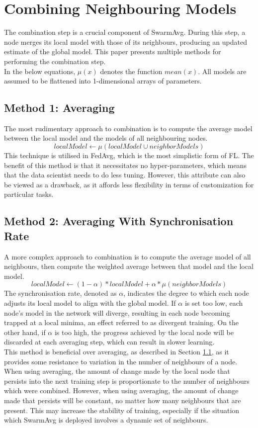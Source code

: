 \section{Combining Neighbouring Models} \label{mcm}
The combination step is a crucial component of SwarmAvg. During this step, a node merges its local model with those of its neighbours, producing an updated estimate of the global model. This paper presents multiple methods for performing the combination step. \\

In the below equations, $\mu(x)$ denotes the function $mean(x)$. All models are assumed to be flattened into 1-dimensional arrays of parameters.

\subsection{Method 1: Averaging} \label{mcm:avg}
The most rudimentary approach to combination is to compute the average model between the local model and the models of all neighbouring nodes.
\[ localModel \gets \mu(localModel \cup neighborModels) \]
This technique is utilised in FedAvg, which is the most simplistic form of FL. The benefit of this method is that it necessitates no hyper-parameters, which means that the data scientist needs to do less tuning. However, this attribute can also be viewed as a drawback, as it affords less flexibility in terms of customization for particular tasks.

\subsection{Method 2: Averaging With Synchronisation Rate}
A more complex approach to combination is to compute the average model of all neighbours, then compute the weighted average between that model and the local model.
\[ localModel \gets (1 - \alpha) * localModel + \alpha * \mu(neighborModels) \]
The synchronisation rate, denoted as $\alpha$, indicates the degree to which each node adjusts its local model to align with the global model. If $\alpha$ is set too low, each node's model in the network will diverge, resulting in each node becoming trapped at a local minima, an effect referred to as divergent training. On the other hand, if $\alpha$ is too high, the progress achieved by the local node will be discarded at each averaging step, which can result in slower learning. \\

This method is beneficial over averaging, as described in Section \ref{mcm:avg}, as it provides some resistance to variation in the number of neighbours of a node. When using averaging, the amount of change made by the local node that persists into the next training step is proportionate to the number of neighbours which were combined. However, when using averaging, the amount of change made that persists will be constant, no matter how many neighbours that are present. This may increase the stability of training, especially if the situation which SwarmAvg is deployed involves a dynamic set of neighbours.


